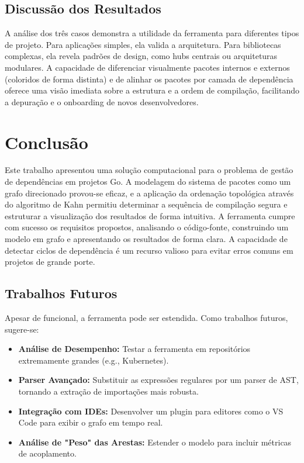 \documentclass[12pt]{article}
\begin{document}
\FloatBarrier

\subsection{Discussão dos Resultados}
A análise dos três casos demonstra a utilidade da ferramenta para diferentes tipos de projeto. Para aplicações simples, ela valida a arquitetura. Para bibliotecas complexas, ela revela padrões de design, como hubs centrais ou arquiteturas modulares. A capacidade de diferenciar visualmente pacotes internos e externos (coloridos de forma distinta) e de alinhar os pacotes por camada de dependência oferece uma visão imediata sobre a estrutura e a ordem de compilação, facilitando a depuração e o onboarding de novos desenvolvedores.

\section{Conclusão}
Este trabalho apresentou uma solução computacional para o problema de gestão de dependências em projetos Go. A modelagem do sistema de pacotes como um grafo direcionado provou-se eficaz, e a aplicação da ordenação topológica através do algoritmo de Kahn \cite{kahn1962} permitiu determinar a sequência de compilação segura e estruturar a visualização dos resultados de forma intuitiva. A ferramenta cumpre com sucesso os requisitos propostos, analisando o código-fonte, construindo um modelo em grafo e apresentando os resultados de forma clara. A capacidade de detectar ciclos de dependência é um recurso valioso para evitar erros comuns em projetos de grande porte.

\subsection{Trabalhos Futuros}
Apesar de funcional, a ferramenta pode ser estendida. Como trabalhos futuros, sugere-se:
\begin{itemize}
    \item \textbf{Análise de Desempenho:} Testar a ferramenta em repositórios extremamente grandes (e.g., Kubernetes).
    \item \textbf{Parser Avançado:} Substituir as expressões regulares por um parser de AST, tornando a extração de importações mais robusta.
    \item \textbf{Integração com IDEs:} Desenvolver um plugin para editores como o VS Code para exibir o grafo em tempo real.
    \item \textbf{Análise de "Peso" das Arestas:} Estender o modelo para incluir métricas de acoplamento.
\end{itemize}



\end{document}
